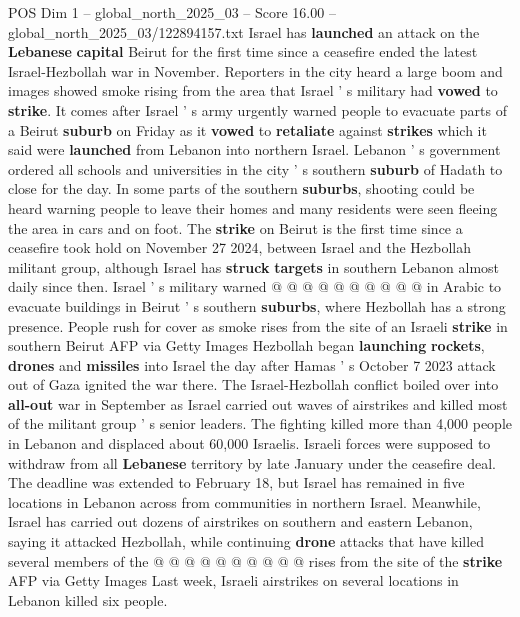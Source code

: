\begin{textsample}{POS Dim 1 – global\_north\_2025\_03 – Score 16.00 – global\_north\_2025\_03/122894157.txt}  \label{ex:f1_pos_427}
Israel has \textbf{launched} an attack on the \textbf{Lebanese} \textbf{capital} Beirut for the first time since a ceasefire ended the latest Israel-Hezbollah war in November.
Reporters in the city heard a large boom and images showed smoke rising from the area that Israel ' s military had \textbf{vowed} to \textbf{strike}.
It comes after Israel ' s army urgently warned people to evacuate parts of a Beirut \textbf{suburb} on Friday as it \textbf{vowed} to \textbf{retaliate} against \textbf{strikes} which it said were \textbf{launched} from Lebanon into northern Israel.
Lebanon ' s government ordered all schools and universities in the city ' s southern \textbf{suburb} of Hadath to close for the day.
In some parts of the southern \textbf{suburbs}, shooting could be heard warning people to leave their homes and many residents were seen fleeing the area in cars and on foot.
The \textbf{strike} on Beirut is the first time since a ceasefire took hold on November 27 2024, between Israel and the Hezbollah militant group, although Israel has \textbf{struck} \textbf{targets} in southern Lebanon almost daily since then.
Israel ' s military warned @ @ @ @ @ @ @ @ @ @ in Arabic to evacuate buildings in Beirut ' s southern \textbf{suburbs}, where Hezbollah has a strong presence.
People rush for cover as smoke rises from the site of an Israeli \textbf{strike} in southern Beirut AFP via Getty Images Hezbollah began \textbf{launching} \textbf{rockets}, \textbf{drones} and \textbf{missiles} into Israel the day after Hamas ' s October 7 2023 attack out of Gaza ignited the war there.
The Israel-Hezbollah conflict boiled over into \textbf{all-out} war in September as Israel carried out waves of airstrikes and killed most of the militant group ' s senior leaders.
The fighting killed more than 4,000 people in Lebanon and displaced about 60,000 Israelis.
Israeli forces were supposed to withdraw from all \textbf{Lebanese} territory by late January under the ceasefire deal.
The deadline was extended to February 18, but Israel has remained in five locations in Lebanon across from communities in northern Israel.
Meanwhile, Israel has carried out dozens of airstrikes on southern and eastern Lebanon, saying it attacked Hezbollah, while continuing \textbf{drone} attacks that have killed several members of the @ @ @ @ @ @ @ @ @ @ rises from the site of the \textbf{strike} AFP via Getty Images Last week, Israeli airstrikes on several locations in Lebanon killed six people.

\end{textsample}
